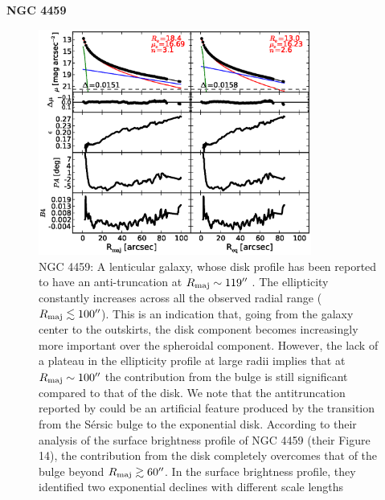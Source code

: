 \documentclass[preprint2]{emulateapj}
\newcommand{\fitfigurewidth}{0.8\textwidth}
\begin{document}
  \clearpage\newpage\noindent
  {\bf NGC 4459 \\}

  \begin{figure}[h]
  \begin{center}
  \includegraphics[width=\fitfigurewidth]{n4459_1Dfit.eps}
  \caption{NGC 4459: 
  A lenticular galaxy, 
  whose disk profile has been reported to have an anti-truncation at $R_{\rm maj} \sim 119''$ \citep{gutierrez2011}.
  The ellipticity constantly increases across all the observed radial range ($R_{\rm maj} \lesssim 100''$).
  This is an indication that, going from the galaxy center to the outskirts,
  the disk component becomes increasingly more important over the spheroidal component.
  However, the lack of a plateau in the ellipticity profile at large radii implies that at $R_{\rm maj} \sim 100''$ 
  the contribution from the bulge is still significant compared to that of the disk.
  We note that the antitruncation reported by \cite{gutierrez2011} could be an artificial feature 
  produced by the transition from the S\'ersic bulge to the exponential disk. 
  According to their analysis of the surface brightness profile of NGC 4459 (their Figure 14), 
  the contribution from the disk completely overcomes that of the bulge beyond $R_{\rm maj} \gtrsim 60''$. 
  In the surface brightness profile, they identified two exponential declines with different scale lengths 
}
\end{center}
\end{figure}
\end{document}
